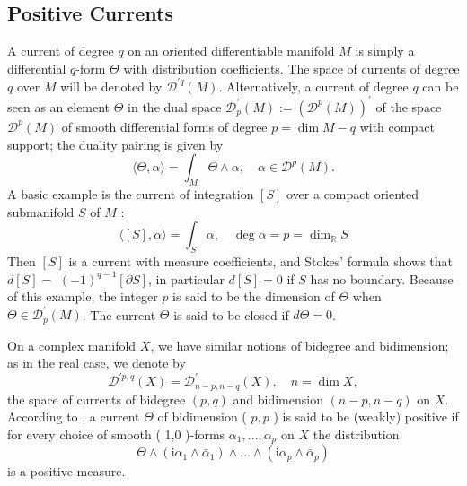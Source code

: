 \documentclass[lang=en,12pt,twoside]{textbook}
\begin{document}
\subsection{Positive Currents}
A current of degree $q$ on an oriented differentiable manifold $M$ is simply a differential $q$-form $\Theta$ with distribution coefficients. The space of currents of degree $q$ over $M$ will be denoted by $\mathscr{D}^{\prime q}(M)$. Alternatively, a current of degree $q$ can be seen as an element $\Theta$ in the dual space $\mathscr{D}_p^{\prime}(M):=\left(\mathscr{D}^p(M)\right)^{\prime}$ of the space $\mathscr{D}^p(M)$ of smooth differential forms of degree $p=\operatorname{dim} M-q$ with compact support; the duality pairing is given by
\begin{equation}\label{eq:2.1}
    \langle\Theta, \alpha\rangle=\int_M \Theta \wedge \alpha, \quad \alpha \in \mathscr{D}^p(M) .
\end{equation}
A basic example is the current of integration $[S]$ over a compact oriented submanifold $S$ of $M$ :
\begin{equation}\label{eq:2.2}
    \langle[S], \alpha\rangle=\int_S \alpha, \quad \operatorname{deg} \alpha=p=\operatorname{dim}_{\mathbb{R}} S
\end{equation}
Then $[S]$ is a current with measure coefficients, and Stokes' formula shows that $d[S]=$ $(-1)^{q-1}[\partial S]$, in particular $d[S]=0$ if $S$ has no boundary. Because of this example, the integer $p$ is said to be the dimension of $\Theta$ when $\Theta \in \mathscr{D}_p^{\prime}(M)$. The current $\Theta$ is said to be closed if $d \Theta=0$.

On a complex manifold $X$, we have similar notions of bidegree and bidimension; as in the real case, we denote by
\begin{equation}\label{eq:2.3}
    \mathscr{D}^{\prime p, q}(X)=\mathscr{D}_{n-p, n-q}^{\prime}(X), \quad n=\operatorname{dim} X,
\end{equation}
the space of currents of bidegree $(p, q)$ and bidimension $(n-p, n-q)$ on $X$. According to \cite{lelong1957integration}, a current $\Theta$ of bidimension ( $p, p$ ) is said to be (weakly) positive if for every choice of smooth ( 1,0 )-forms $\alpha_1, \ldots, \alpha_p$ on $X$ the distribution
$$\Theta \wedge (\mathrm{i} \alpha_1 \wedge \bar{\alpha}_1) \wedge \ldots \wedge (\mathrm{i} \alpha_p \wedge \bar{\alpha}_p) $$ is a positive measure.
\end{document}
